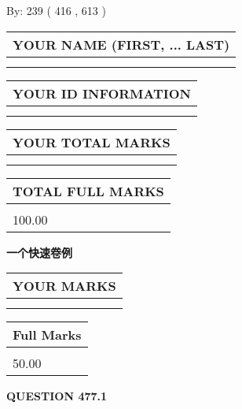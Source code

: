 \documentclass{ctexart}
\begin{document}
   
\hspace{1.0in} By: 
 239 ( 416 ,  613 )
   
   
   
   
\newpage 
\setcounter{page}{ 
   477001 } 
   
   
   
   
\noindent\begin{tabular}{|l|}
\hline
YOUR NAME (FIRST, ... LAST)  \\
\hline
 \\ 
 \\ 
\hline
\end{tabular}
\hspace{0.05in} \begin{tabular}{|l|}
\hline
 YOUR   ID   INFORMATION  \\
\hline
 \\ 
 \\ 
\hline
\end{tabular}
   
   
\vspace{0.2in}\noindent\begin{tabular}{|l|}
\hline
YOUR TOTAL MARKS  \\
\hline
 \\ 
 \\ 
\hline
\end{tabular}
\hspace{0.05in} \begin{tabular}{|l|}
\hline
TOTAL FULL MARKS  \\
\hline
 \\ 
100.00 \\
\hline
\end{tabular}
   
   
 \vspace{0.2in}
{\LARGE {\textbf{ 一个快速卷例}}}
   
   
  
\vspace{0.2in}
  
\noindent\begin{tabular}{|l|}
\hline
 YOUR MARKS  \\
\hline
 \\ 
 \\ 
\hline
\end{tabular}
\hspace{0.05in} \begin{tabular}{|l|}
\hline
 Full Marks  \\
\hline
 \\ 
50.00 \\
\hline
\end{tabular}
{\textbf{\Large{QUESTION
477.1 
}}}
  
\end{document}
